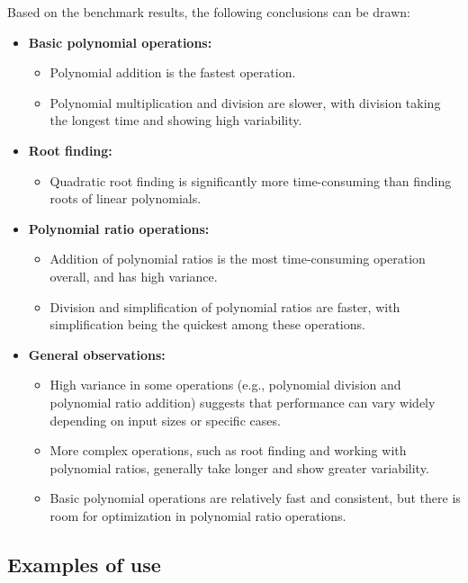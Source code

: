 Based on the benchmark results, the following conclusions can be drawn:

\begin{itemize}
    \item \textbf{Basic polynomial operations:} 
    \begin{itemize}
        \item Polynomial addition is the fastest operation.
        \item Polynomial multiplication and division are slower, with division taking the longest time and showing high variability.
    \end{itemize}

    \item \textbf{Root finding:}
    \begin{itemize}
        \item Quadratic root finding is significantly more time-consuming than finding roots of linear polynomials.
    \end{itemize}

    \item \textbf{Polynomial ratio operations:}
    \begin{itemize}
        \item Addition of polynomial ratios is the most time-consuming operation overall, and has high variance.
        \item Division and simplification of polynomial ratios are faster, with simplification being the quickest among these operations.
    \end{itemize}
    
    \item \textbf{General observations:}
    \begin{itemize}
        \item High variance in some operations (e.g., polynomial division and polynomial ratio addition) suggests that performance can vary widely depending on input sizes or specific cases.
        \item More complex operations, such as root finding and working with polynomial ratios, generally take longer and show greater variability.
        \item Basic polynomial operations are relatively fast and consistent, but there is room for optimization in polynomial ratio operations.
    \end{itemize}
\end{itemize}

\subsection{Examples of use}\label{subsec:examples-of-use}


